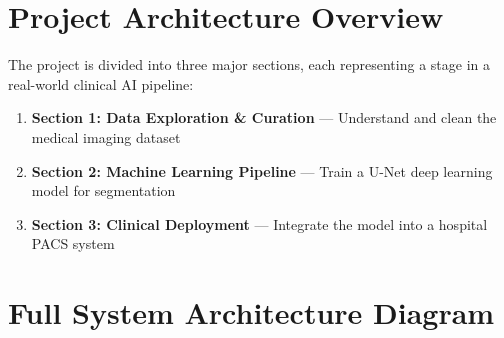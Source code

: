 \documentclass[12pt,a4paper]{report}
\begin{document}
\section{Project Architecture Overview}

The project is divided into three major sections, each representing a stage in a real-world clinical AI pipeline:

\begin{enumerate}
    \item \textbf{Section 1: Data Exploration \& Curation} --- Understand and clean the medical imaging dataset
    \item \textbf{Section 2: Machine Learning Pipeline} --- Train a U-Net deep learning model for segmentation
    \item \textbf{Section 3: Clinical Deployment} --- Integrate the model into a hospital PACS system
\end{enumerate}

\section{Full System Architecture Diagram}
\end{document}
